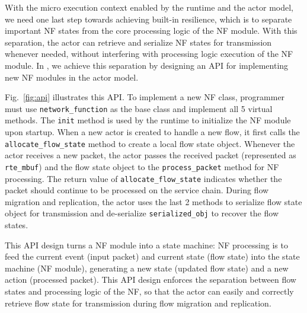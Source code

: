With the micro execution context enabled by the runtime and the actor model, we need one last step towards achieving built-in resilience, which is %
 to separate important NF states from the core processing logic of the NF module. With this separation, the actor can retrieve and serialize NF states for transmission whenever needed, without interfering with processing logic execution of the NF module. In \nfactor, we achieve this separation by designing an API for implementing new NF modules in the actor model. 

Fig.~\ref{fig:api} illustrates this API. To implement a new NF class, programmer must use {\tt network\_function} as the base class and implement all 5 virtual methods. The {\tt init} method is used by the runtime to initialize the NF module upon startup. When a new actor is created to handle a new flow, it first calls the {\tt allocate\_flow\_state} method to create a local flow state object. Whenever the actor receives a new packet, the actor passes the received packet (represented as {\tt rte\_mbuf}) and the flow state object to the {\tt process\_packet} method for NF processing. The return value of {\tt allocate\_flow\_state} indicates whether the packet should continue to be processed on the service chain. During flow migration and replication, the actor uses the last 2 methods to serialize flow state object for transmission and de-serialize {\tt serialized\_obj} to recover the flow states. 

This API design turns a NF module into a state machine: %
NF processing is to feed the current event (input packet) and current state (flow state) into the state machine (NF module), generating a new state (updated flow state) and a new action (processed packet). This API design enforces the separation between flow states and processing logic of the NF, so that the actor can easily and correctly retrieve flow state for transmission during flow migration and replication.

